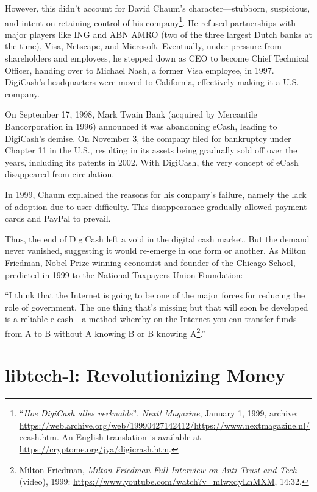 \documentclass[
  a5paper,
  smalldemyvopaper,10pt,twoside,onecolumn,openright,extrafontsizes,hidelinks]{memoir}
\begin{document}
However, this didn't account for David Chaum's character---stubborn,
suspicious, and intent on retaining control of his company\footnote{``\emph{Hoe
  DigiCash alles verknalde}'', \emph{Next! Magazine}, January 1, 1999,
  archive:
  \url{https://web.archive.org/web/19990427142412/https://www.nextmagazine.nl/ecash.htm}.
  An English translation is available at
  \url{https://cryptome.org/jya/digicrash.htm}.}. He refused
partnerships with major players like ING and ABN AMRO (two of the three
largest Dutch banks at the time), Visa, Netscape, and Microsoft.
Eventually, under pressure from shareholders and employees, he stepped
down as CEO to become Chief Technical Officer, handing over to Michael
Nash, a former Visa employee, in 1997. DigiCash's headquarters were
moved to California, effectively making it a U.S. company.

On September 17, 1998, Mark Twain Bank (acquired by Mercantile
Bancorporation in 1996) announced it was abandoning eCash, leading to
DigiCash's demise. On November 3, the company filed for bankruptcy under
Chapter 11 in the U.S., resulting in its assets being gradually sold off
over the years, including its patents in 2002. With DigiCash, the very
concept of eCash disappeared from circulation.

In 1999, Chaum explained the reasons for his company's failure, namely
the lack of adoption due to user difficulty. This disappearance
gradually allowed payment cards and PayPal to prevail.

Thus, the end of DigiCash left a void in the digital cash market. But
the demand never vanished, suggesting it would re-emerge in one form or
another. As Milton Friedman, Nobel Prize-winning economist and founder
of the Chicago School, predicted in 1999 to the National Taxpayers Union
Foundation:

``I think that the Internet is going to be one of the major forces for
reducing the role of government. The one thing that's missing but that
will soon be developed is a reliable e-cash---a method whereby on the
Internet you can transfer funds from A to B without A knowing B or B
knowing A\footnote{Milton Friedman, \emph{Milton Friedman Full Interview
  on Anti-Trust and Tech} (video), 1999:
  \url{https://www.youtube.com/watch?v=mlwxdyLnMXM}, 14:32.}.''

\section*{libtech-l: Revolutionizing
Money}\label{libtech-l-revolutionizing-money}
\end{document}
